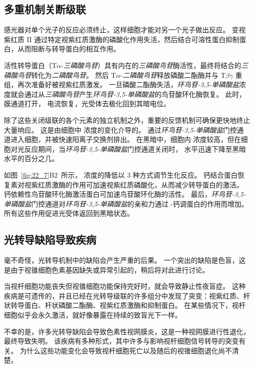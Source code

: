 \subsection{多重机制关断级联}

感光器对单个光子的反应必须终止，这样细胞才能对另一个光子做出反应。
变视紫红质 II 通过特定视紫红质激酶的磷酸化作用失活，然后结合可溶性蛋白抑制蛋白，从而阻断与转导蛋白的相互作用。


活性转导蛋白（T$\alpha$-\textit{三磷酸鸟苷}）具有内在的\textit{三磷酸鸟苷}酶活性，最终将结合的\textit{三磷酸鸟苷}转化为\textit{二磷酸鸟苷}。
然后 T$\alpha$-\textit{二磷酸鸟苷}释放磷酸二酯酶并与 T$\beta$$\gamma$ 重组，再次准备好被视紫红质激发。
一旦磷酸二酯酶失活，\textit{环鸟苷-3,5-单磷酸盐}浓度就会通过从\textit{三磷酸鸟苷}产生\textit{环鸟苷-3,5-单磷酸盐}的鸟苷酸环化酶恢复。
此时，膜通道打开， 电流恢复，光受体去极化回到其暗电位。


除了这些关闭级联的各个元素的独立机制之外，重要的反馈机制可确保更快地终止大量响应。
这是由细胞中  浓度的变化介导的。
通过\textit{环鸟苷-3,5-单磷酸盐}门控通道进入细胞，并被快速阳离子交换剂排出。
在黑暗中，细胞内  浓度较高，但在细胞对光反应期间，当\textit{环鸟苷-3,5-单磷酸盐}门控通道关闭时， 水平迅速下降至黑暗水平的百分之几。


如图~\ref{fig:22_7}B2~所示， 浓度的降低以 3 种方式调节生化反应。
钙结合蛋白恢复素对视紫红质激酶的作用可加速视紫红质磷酸化，从而减少转导蛋白的激活。
钙依赖性鸟苷酸环化酶激活蛋白可加速鸟苷酸环化酶的活性。
最后，\textit{环鸟苷-3,5-单磷酸盐}门控通道对\textit{环鸟苷-3,5-单磷酸盐}的亲和力通过 -钙调蛋白的作用而增加。
所有这些作用促进光受体返回到黑暗状态。



\subsection{光转导缺陷导致疾病}

毫不奇怪，光转导机制中的缺陷会产生严重的后果。
一个突出的缺陷是色盲，这是由于视锥细胞色素基因缺失或异常引起的，稍后将对此进行讨论。


当视杆细胞功能丧失但视锥细胞功能保持完好时，就会导致静止性夜盲症。
这种疾病是可遗传的，并且已经在光转导级联的许多组分中发现了突变：视紫红质、杆状转导蛋白、杆状磷酸二酯酶、视紫红质激酶和抑制蛋白。
在某些情况下，视杆细胞似乎会永久激活，就好像暴露在持续的致盲光下一样。


不幸的是，许多光转导缺陷会导致色素性视网膜炎，这是一种视网膜进行性退化，最终导致失明。
该疾病有多种形式，其中许多与影响视杆细胞信号转导的突变有关。
为什么这些功能变化会导致视杆细胞死亡以及随后的视锥细胞退化尚不清楚。



